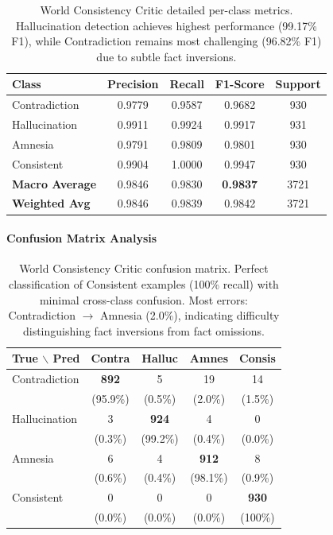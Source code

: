 \documentclass[11pt]{article}
\begin{document}
\begin{table}[h]
\centering
\small
\begin{tabular}{lcccc}
\toprule
\textbf{Class} & \textbf{Precision} & \textbf{Recall} & \textbf{F1-Score} & \textbf{Support} \\
\midrule
Contradiction & 0.9779 & 0.9587 & 0.9682 & 930 \\
Hallucination & 0.9911 & 0.9924 & 0.9917 & 931 \\
Amnesia & 0.9791 & 0.9809 & 0.9801 & 930 \\
Consistent & 0.9904 & 1.0000 & 0.9947 & 930 \\
\midrule
\textbf{Macro Average} & 0.9846 & 0.9830 & \textbf{0.9837} & 3721 \\
\textbf{Weighted Avg} & 0.9846 & 0.9839 & 0.9842 & 3721 \\
\bottomrule
\end{tabular}
\caption{World Consistency Critic detailed per-class metrics. Hallucination detection achieves highest performance (99.17\% F1), while Contradiction remains most challenging (96.82\% F1) due to subtle fact inversions.}
\end{table}

\paragraph{Confusion Matrix Analysis}

\begin{table}[h]
\centering
\begin{tabular}{lcccc}
\toprule
\textbf{True $\backslash$ Pred} & \textbf{Contra} & \textbf{Halluc} & \textbf{Amnes} & \textbf{Consis} \\
\midrule
Contradiction & \textbf{892} & 5 & 19 & 14 \\
 & (95.9\%) & (0.5\%) & (2.0\%) & (1.5\%) \\
\midrule
Hallucination & 3 & \textbf{924} & 4 & 0 \\
 & (0.3\%) & (99.2\%) & (0.4\%) & (0.0\%) \\
\midrule
Amnesia & 6 & 4 & \textbf{912} & 8 \\
 & (0.6\%) & (0.4\%) & (98.1\%) & (0.9\%) \\
\midrule
Consistent & 0 & 0 & 0 & \textbf{930} \\
 & (0.0\%) & (0.0\%) & (0.0\%) & (100\%) \\
\bottomrule
\end{tabular}
\caption{World Consistency Critic confusion matrix. Perfect classification of Consistent examples (100\% recall) with minimal cross-class confusion. Most errors: Contradiction $\rightarrow$ Amnesia (2.0\%), indicating difficulty distinguishing fact inversions from fact omissions.}
\end{table}
\end{document}
